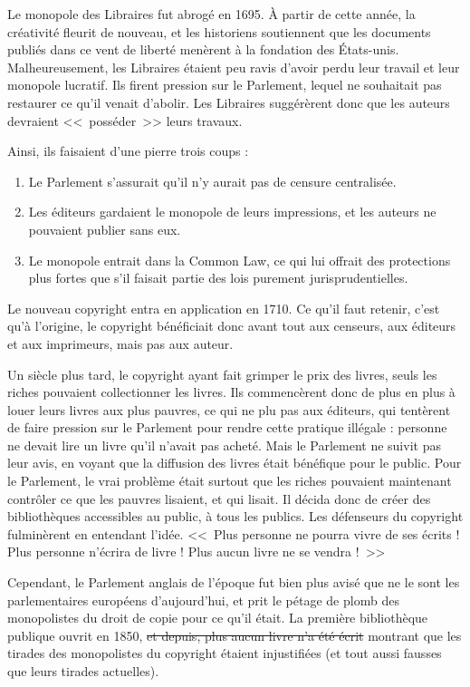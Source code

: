 Le monopole des Libraires fut abrogé en 1695.
À partir de cette année, la créativité fleurit de nouveau, et les historiens soutiennent que les documents publiés dans ce vent de liberté menèrent à la fondation des États-unis.
Malheureusement, les Libraires étaient peu ravis d'avoir perdu leur travail et leur monopole lucratif.
Ils firent pression sur le Parlement, lequel ne souhaitait pas restaurer ce qu'il venait d'abolir.
Les Libraires suggérèrent donc que les auteurs devraient <<~posséder~>> leurs travaux.

Ainsi, ils faisaient d'une pierre trois coups :

\begin{enumerate}
\item Le Parlement s'assurait qu'il n'y aurait pas de censure centralisée.
\item Les éditeurs gardaient le monopole de leurs impressions, et les auteurs ne pouvaient publier sans eux.
\item Le monopole entrait dans la Common Law, ce qui lui offrait des protections plus fortes que s'il faisait partie des lois purement jurisprudentielles.
\end{enumerate}\bigskip

Le nouveau copyright entra en application en 1710.
Ce qu'il faut retenir, c'est qu'à l'origine, le copyright bénéficiait donc avant tout aux censeurs, aux éditeurs et aux imprimeurs, mais pas aux auteur.

Un siècle plus tard, le copyright ayant fait grimper le prix des livres, seuls les riches pouvaient collectionner les livres.
Ils commencèrent donc de plus en plus à louer leurs livres aux plus pauvres, ce qui ne plu pas aux éditeurs, qui tentèrent de faire pression sur le Parlement pour rendre cette pratique illégale : personne ne devait lire un livre qu'il n'avait pas acheté.
Mais le Parlement ne suivit pas leur avis, en voyant que la diffusion des livres était bénéfique pour le public.
Pour le Parlement, le vrai problème était surtout que les riches pouvaient maintenant contrôler ce que les pauvres lisaient, et qui lisait.
Il décida donc de créer des bibliothèques accessibles au public, à tous les publics.
Les défenseurs du copyright fulminèrent en entendant l'idée.
<<~Plus personne ne pourra vivre de ses écrits ! Plus personne n'écrira de livre ! Plus aucun livre ne se vendra !~>>

Cependant, le Parlement anglais de l'époque fut bien plus avisé que ne le sont les parlementaires européens d'aujourd'hui, et prit le pétage de plomb des monopolistes du droit de copie pour ce qu'il était. 
La première bibliothèque publique ouvrit en 1850, \sout{et depuis, plus aucun livre n'a été écrit} montrant que les tirades des monopolistes du copyright étaient injustifiées (et tout aussi fausses que leurs tirades actuelles).

